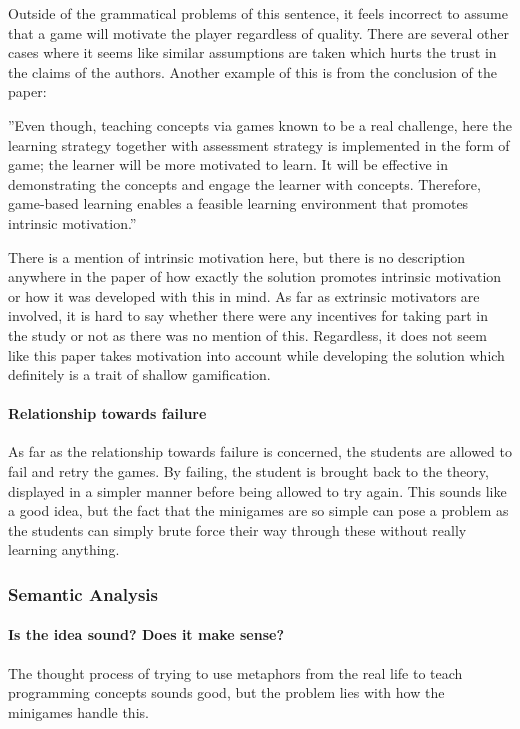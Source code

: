 Outside of the grammatical problems of this sentence, it feels incorrect to assume that a game will motivate the player regardless of quality. There are several other cases where it seems like similar assumptions are taken which hurts the trust in the claims of the authors. Another example of this is from the conclusion of the paper:
\begin{displayquote}
''Even though, teaching concepts via games known to be a real challenge, here the learning strategy together with assessment strategy is implemented in the form of game; the learner will be more motivated to learn. It will be effective in demonstrating the concepts and engage the learner with concepts. Therefore, game-based learning enables a feasible learning environment that promotes intrinsic motivation.''
\end{displayquote}
There is a mention of intrinsic motivation here, but there is no description anywhere in the paper of how exactly the solution promotes intrinsic motivation or how it was developed with this in mind. As far as extrinsic motivators are involved, it is hard to say whether there were any incentives for taking part in the study or not as there was no mention of this. Regardless, it does not seem like this paper takes motivation into account while developing the solution which definitely is a trait of shallow gamification. 

\paragraph{Relationship towards failure}
As far as the relationship towards failure is concerned, the students are allowed to fail and retry the games. By failing, the student is brought back to the theory, displayed in a simpler manner before being allowed to try again. This sounds like a good idea, but the fact that the minigames are so simple can pose a problem as the students can simply brute force their way through these without really learning anything. 

\subsubsection{Semantic Analysis}
\paragraph{Is the idea sound? Does it make sense?}
The thought process of trying to use metaphors from the real life to teach programming concepts sounds good, but the problem lies with how the minigames handle this. 

